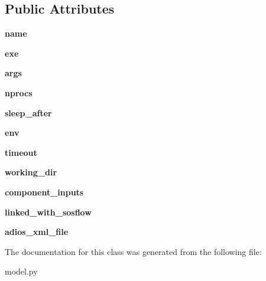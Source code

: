 \subsection*{Public Attributes}
\begin{DoxyCompactItemize}
\item 
\mbox{\label{classcodar_1_1cheetah_1_1model_1_1_run_component_a743773d825aa10e6ef12ae695277c039}} 
{\bfseries name}
\item 
\mbox{\label{classcodar_1_1cheetah_1_1model_1_1_run_component_ad2e4c00739c82e7a9e777056f6735a72}} 
{\bfseries exe}
\item 
\mbox{\label{classcodar_1_1cheetah_1_1model_1_1_run_component_a61b71b40331e4375a82cf0be848acff5}} 
{\bfseries args}
\item 
\mbox{\label{classcodar_1_1cheetah_1_1model_1_1_run_component_af9dfa80f9ec439a94ca09d7db279c63c}} 
{\bfseries nprocs}
\item 
\mbox{\label{classcodar_1_1cheetah_1_1model_1_1_run_component_acb1eadc1f5def0e5b74cef8042ee3baa}} 
{\bfseries sleep\+\_\+after}
\item 
\mbox{\label{classcodar_1_1cheetah_1_1model_1_1_run_component_ab041ae0903ff2773788ef1759b5aeca0}} 
{\bfseries env}
\item 
\mbox{\label{classcodar_1_1cheetah_1_1model_1_1_run_component_aab7eb17918554027035c553b8580c140}} 
{\bfseries timeout}
\item 
\mbox{\label{classcodar_1_1cheetah_1_1model_1_1_run_component_a63435d4ed53fefe7a99230d88cae4e32}} 
{\bfseries working\+\_\+dir}
\item 
\mbox{\label{classcodar_1_1cheetah_1_1model_1_1_run_component_a1d8cb3d579339ac5eba3c0311640b382}} 
{\bfseries component\+\_\+inputs}
\item 
\mbox{\label{classcodar_1_1cheetah_1_1model_1_1_run_component_a70c8417b14f64e93c812d52d63180e1f}} 
{\bfseries linked\+\_\+with\+\_\+sosflow}
\item 
\mbox{\label{classcodar_1_1cheetah_1_1model_1_1_run_component_a2a855ca947ebabda952f8dab7c1fe4a6}} 
{\bfseries adios\+\_\+xml\+\_\+file}
\end{DoxyCompactItemize}


The documentation for this class was generated from the following file\+:\begin{DoxyCompactItemize}
\item 
model.\+py\end{DoxyCompactItemize}
